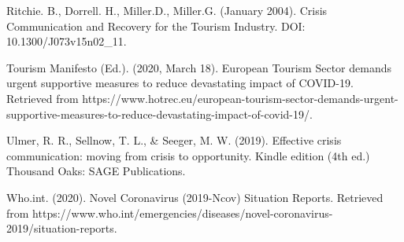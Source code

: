 \begin{flushleft}
Ritchie. B., Dorrell. H., Miller.D., Miller.G. (January 2004). Crisis Communication and Recovery for the Tourism Industry. DOI: 10.1300/J073v15n02\_11.

Tourism Manifesto (Ed.). (2020, March 18). European Tourism Sector demands urgent supportive measures to reduce devastating impact of COVID-19. Retrieved from https://www.hotrec.eu/european-tourism-sector-demands-urgent-supportive-measures-to-reduce-devastating-impact-of-covid-19/.

Ulmer, R. R., Sellnow, T. L., \& Seeger, M. W. (2019). Effective crisis communication: moving from crisis to opportunity. Kindle edition (4th ed.) Thousand Oaks: SAGE Publications.

Who.int. (2020). Novel Coronavirus (2019-Ncov) Situation Reports. Retrieved from https://www.who.int/emergencies/diseases/novel-coronavirus-2019/situation-reports.
\end{flushleft}
